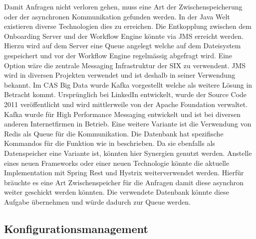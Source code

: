 Damit Anfragen nicht verloren gehen, muss eine Art der Zwischenspeicherung oder der asynchronen Kommunikation gefunden werden. In der Java Welt existieren diverse Technologien dies zu erreichen.\newline
Die Entkopplung zwischen dem Onboarding Server und der Workflow Engine könnte via JMS erreicht werden. Hierzu wird auf dem Server eine Queue angelegt welche auf dem Dateisystem gespeichert und vor der Workflow Engine regelmässig abgefragt wird. Eine Option wäre die zentrale Messaging Infrastruktur der SIX zu verwendent. JMS wird in diversen Projekten verwendet und ist deshalb in seiner Verwendung bekannt.\newline
Im CAS Big Data wurde Kafka vorgestellt welche als weitere Lösung in Betracht kommt. Ursprünglich bei LinkedIn entwickelt, wurde der Source Code 2011 veröffentlicht und wird mittlerweile von der Apache Foundation verwaltet. Kafka wurde für High Performance Messaging entwickelt und ist bei diversen anderen Internetfirmen in Betrieb.\newline
Eine weitere Variante ist die Verwendung von Redis als Queue für die Kommunikation. Die Datenbank hat spezifische Kommandos für die Funktion wie in \cite{redisqueue} beschrieben. Da sie ebenfalls als Datenspeicher eine Variante ist, könnten hier Synergien genutzt werden.\newline
Anstelle eines neuen Frameworks oder einer neuen Technologie könnte die aktuelle Implementation mit Spring Rest und Hystrix weiterverwendet werden. Hierfür bräuchte es eine Art Zwischenspeicher für die Anfragen damit diese asynchron weiter geschickt werden könnten. Die verwendete Datenbank könnte diese Aufgabe übernehmen und würde dadurch zur Queue werden.

\subsection{Konfigurationsmanagement}

